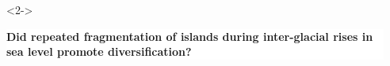 {
\begin{frame}
    \begin{columns}

        \vspace{6.5cm}

        \ \\


        \vspace{-2cm}

        \begin{uncoverenv}<2->
        \colorbox{white}{
            \begin{minipage}[t]{1.0\textwidth}
                \raggedright
                \textbf{Did repeated fragmentation of islands during
                    inter-glacial rises in sea level promote diversification?}
            \end{minipage}
        }
        \end{uncoverenv}
    \end{columns}
\end{frame}
}

